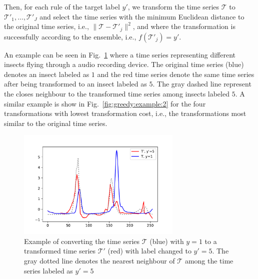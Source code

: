 \documentclass[smallextended,natbib]{svjour3}
\begin{document}
Then, for each rule of the target label $y'$, we transform the time series $\mathcal{T}$ to $\mathcal{T}'_1,\ldots,\mathcal{T}'_J$ and select the time series with the minimum Euclidean distance to the original time series, i.e., $\lVert \mathcal{T} - \mathcal{T}'_j\rVert^2$, and where the transformation is successfully according to the ensemble, i.e., $f(\mathcal{T}'_j) = y'$.  


An example can be seen in Fig.~\ref{fig:greedy:example:1} where a time series representing different insects flying through a audio recording device. The original time series (blue) denotes an insect labeled as $1$ and the red time series denote the same time series after being transformed to an insect labeled as $5$. The gray dashed line represent the closes neighbour to the transformed time series among insects labeled $5$. A similar example is show in Fig.~\ref{fig:greedy:example:2} for the four transformations with lowest transformation cost, i.e., the transformations most similar to the original time series.  

\begin{figure}
    \centering
    \includegraphics[width=0.7\textwidth]{figure/greedy/example1.pdf}
    \caption{Example of converting the time series $\mathcal{T}$ (blue) with $y=1$ to a transformed time series $\mathcal{T}'$ (red) with label changed to $y'=5$. The gray dotted line denotes the nearest neighbour of $\mathcal{T}$ among the time series labeled as $y'=5$}
    \label{fig:greedy:example:1}
\end{figure}
\end{document}
